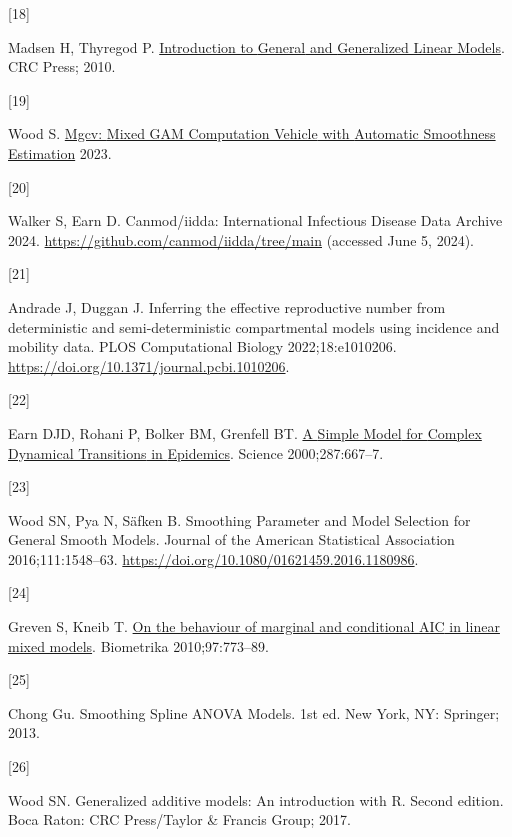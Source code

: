 \documentclass[
11pt, %
oneside, %
english, %
singlespacing, %
]{macthesis} %
\newlength{\cslhangindent}
\newlength{\csllabelwidth}
\newenvironment{CSLReferences}[2] %
{\begin{list}{}{%
	\setlength{\itemindent}{0pt}
	\setlength{\leftmargin}{0pt}
	\setlength{\parsep}{0pt}
	\ifodd #1
	\setlength{\leftmargin}{\cslhangindent}
	\setlength{\itemindent}{-1\cslhangindent}
	\fi
	\setlength{\itemsep}{#2\baselineskip}}}
{\end{list}}
\newcommand{\CSLLeftMargin}[1]{\parbox[t]{\csllabelwidth}{\strut#1\strut}}
\newcommand{\CSLRightInline}[1]{\parbox[t]{\linewidth - \csllabelwidth}{\strut#1\strut}}
\begin{document}
\begin{CSLReferences}{0}{0}
\CSLLeftMargin{{[}18{]} }%
\CSLRightInline{Madsen H, Thyregod P. \href{http://gen.lib.rus.ec/book/index.php?md5=d9ba089c485d875f0dbfdfb40d7f990a}{Introduction to {General} and {Generalized Linear Models}}. CRC Press; 2010.}

\CSLLeftMargin{{[}19{]} }%
\CSLRightInline{Wood S. \href{https://cran.r-project.org/web/packages/mgcv/index.html}{Mgcv: {Mixed GAM Computation Vehicle} with {Automatic Smoothness Estimation}} 2023.}

\CSLLeftMargin{{[}20{]} }%
\CSLRightInline{Walker S, Earn D. Canmod/iidda: {International Infectious Disease Data Archive} 2024. \url{https://github.com/canmod/iidda/tree/main} (accessed June 5, 2024).}

\CSLLeftMargin{{[}21{]} }%
\CSLRightInline{Andrade J, Duggan J. Inferring the effective reproductive number from deterministic and semi-deterministic compartmental models using incidence and mobility data. PLOS Computational Biology 2022;18:e1010206. \url{https://doi.org/10.1371/journal.pcbi.1010206}.}

\CSLLeftMargin{{[}22{]} }%
\CSLRightInline{Earn DJD, Rohani P, Bolker BM, Grenfell BT. \href{https://go-gale-com.libaccess.lib.mcmaster.ca/ps/i.do?p=AONE&sw=w&issn=00368075&v=2.1&it=r&id=GALE\%7CA59410262&sid=googleScholar&linkaccess=abs}{A {Simple Model} for {Complex Dynamical Transitions} in {Epidemics}}. Science 2000;287:667--7.}

\CSLLeftMargin{{[}23{]} }%
\CSLRightInline{Wood SN, Pya N, Säfken B. Smoothing {Parameter} and {Model Selection} for {General Smooth Models}. Journal of the American Statistical Association 2016;111:1548--63. \url{https://doi.org/10.1080/01621459.2016.1180986}.}

\CSLLeftMargin{{[}24{]} }%
\CSLRightInline{Greven S, Kneib T. \href{https://www.jstor.org/stable/29777136}{On the behaviour of marginal and conditional {AIC} in linear mixed models}. Biometrika 2010;97:773--89.}

\CSLLeftMargin{{[}25{]} }%
\CSLRightInline{Chong Gu. Smoothing {Spline ANOVA Models}. 1st ed. New York, NY: Springer; 2013.}

\CSLLeftMargin{{[}26{]} }%
\CSLRightInline{Wood SN. Generalized additive models: An introduction with {R}. Second edition. Boca Raton: CRC Press/Taylor \& Francis Group; 2017.}

\end{CSLReferences}
\end{document}
